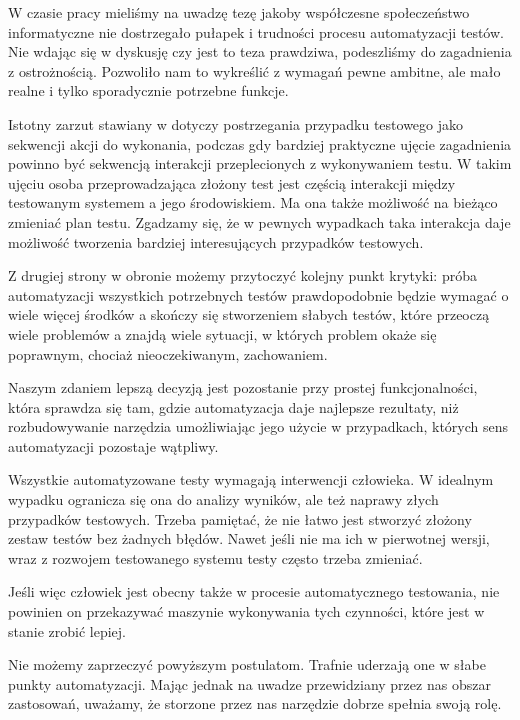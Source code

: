 \documentclass[00-praca-magisterska.tex]{subfiles}
\begin{document}
W czasie pracy mieliśmy na uwadzę tezę jakoby współczesne społeczeństwo
informatyczne nie dostrzegało pułapek i trudności procesu automatyzacji testów.
Nie wdając się w dyskusję czy jest to teza prawdziwa, podeszliśmy do
zagadnienia z ostrożnością. Pozwoliło nam to wykreślić z wymagań pewne ambitne,
ale mało realne i tylko sporadycznie potrzebne funkcje.

Istotny zarzut stawiany w \cite{snake-oil} dotyczy postrzegania przypadku
testowego jako sekwencji akcji do wykonania, podczas gdy bardziej praktyczne
ujęcie zagadnienia powinno być sekwencją interakcji przeplecionych z
wykonywaniem testu. W takim ujęciu osoba przeprowadzająca złożony test jest
częścią interakcji między testowanym systemem a jego środowiskiem. Ma ona także
możliwość na bieżąco zmieniać plan testu. Zgadzamy się, że w pewnych wypadkach
taka interakcja daje możliwość tworzenia bardziej interesujących przypadków
testowych. 

Z drugiej strony w obronie możemy przytoczyć kolejny punkt krytyki: próba
automatyzacji wszystkich potrzebnych testów prawdopodobnie będzie wymagać o
wiele więcej środków a skończy się stworzeniem słabych testów, które przeoczą
wiele problemów a znajdą wiele sytuacji, w których problem okaże się poprawnym,
chociaż nieoczekiwanym, zachowaniem.

Naszym zdaniem lepszą decyzją jest pozostanie przy prostej funkcjonalności,
która sprawdza się tam, gdzie automatyzacja daje najlepsze rezultaty, niż
rozbudowywanie narzędzia umożliwiając jego użycie w przypadkach, których sens
automatyzacji pozostaje wątpliwy.

Wszystkie automatyzowane testy wymagają interwencji człowieka. W idealnym
wypadku ogranicza się ona do analizy wyników, ale też naprawy złych przypadków
testowych. Trzeba pamiętać, że nie łatwo jest stworzyć złożony zestaw testów
bez żadnych błędów. Nawet jeśli nie ma ich w pierwotnej wersji, wraz z rozwojem
testowanego systemu testy często trzeba zmieniać.

Jeśli więc człowiek jest obecny także w procesie automatycznego testowania, nie
powinien on przekazywać maszynie wykonywania tych czynności, które jest w
stanie zrobić lepiej.

Nie możemy zaprzeczyć powyższym postulatom. Trafnie uderzają one w słabe punkty
automatyzacji. Mając jednak na uwadze przewidziany przez nas obszar zastosowań,
uważamy, że storzone przez nas narzędzie dobrze spełnia swoją rolę.
\end{document}
